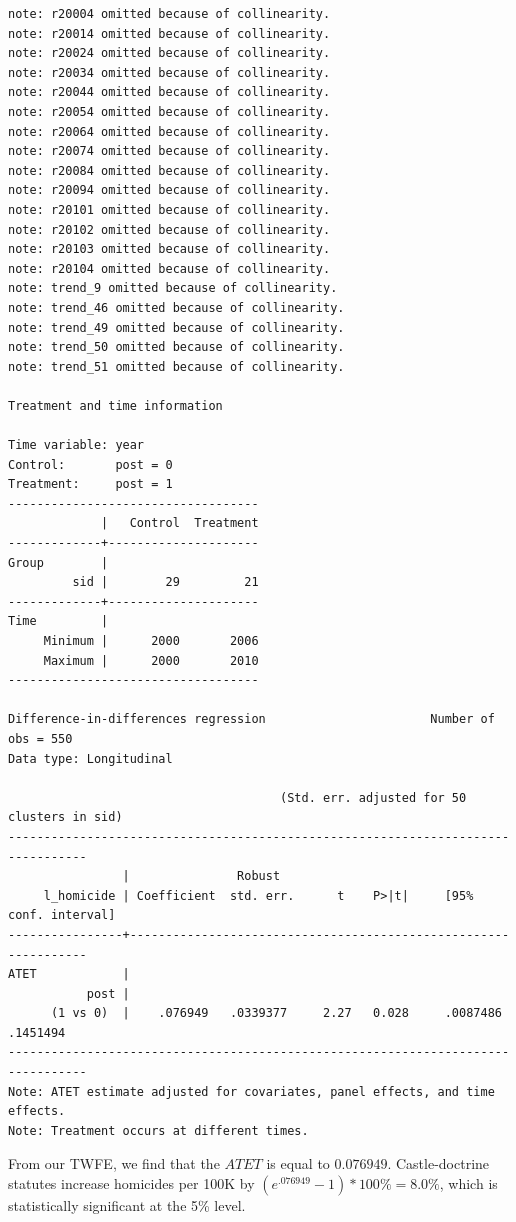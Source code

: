 \documentclass[
]{book}
\begin{document}
\begin{verbatim}
note: r20004 omitted because of collinearity.
note: r20014 omitted because of collinearity.
note: r20024 omitted because of collinearity.
note: r20034 omitted because of collinearity.
note: r20044 omitted because of collinearity.
note: r20054 omitted because of collinearity.
note: r20064 omitted because of collinearity.
note: r20074 omitted because of collinearity.
note: r20084 omitted because of collinearity.
note: r20094 omitted because of collinearity.
note: r20101 omitted because of collinearity.
note: r20102 omitted because of collinearity.
note: r20103 omitted because of collinearity.
note: r20104 omitted because of collinearity.
note: trend_9 omitted because of collinearity.
note: trend_46 omitted because of collinearity.
note: trend_49 omitted because of collinearity.
note: trend_50 omitted because of collinearity.
note: trend_51 omitted because of collinearity.

Treatment and time information

Time variable: year
Control:       post = 0
Treatment:     post = 1
-----------------------------------
             |   Control  Treatment
-------------+---------------------
Group        |
         sid |        29         21
-------------+---------------------
Time         |
     Minimum |      2000       2006
     Maximum |      2000       2010
-----------------------------------

Difference-in-differences regression                       Number of obs = 550
Data type: Longitudinal

                                      (Std. err. adjusted for 50 clusters in sid)
---------------------------------------------------------------------------------
                |               Robust
     l_homicide | Coefficient  std. err.      t    P>|t|     [95% conf. interval]
----------------+----------------------------------------------------------------
ATET            |
           post |
      (1 vs 0)  |    .076949   .0339377     2.27   0.028     .0087486    .1451494
---------------------------------------------------------------------------------
Note: ATET estimate adjusted for covariates, panel effects, and time effects.
Note: Treatment occurs at different times.
\end{verbatim}

From our TWFE, we find that the \(ATET\) is equal to \(0.076949\). Castle-doctrine statutes increase homicides per 100K by \((e^{.076949}-1)*100\% = 8.0\%\), which is statistically significant at the 5\% level.
\end{document}
